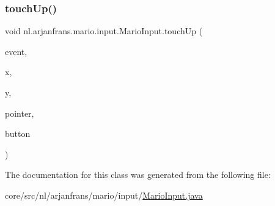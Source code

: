 \subsubsection{\texorpdfstring{touch\+Up()}{touchUp()}}
{\footnotesize\ttfamily void nl.\+arjanfrans.\+mario.\+input.\+Mario\+Input.\+touch\+Up (\begin{DoxyParamCaption}\item[{Input\+Event}]{event,  }\item[{float}]{x,  }\item[{float}]{y,  }\item[{int}]{pointer,  }\item[{int}]{button }\end{DoxyParamCaption})}







The documentation for this class was generated from the following file\+:\begin{DoxyCompactItemize}
\item 
core/src/nl/arjanfrans/mario/input/\hyperlink{MarioInput_8java}{Mario\+Input.\+java}\end{DoxyCompactItemize}
